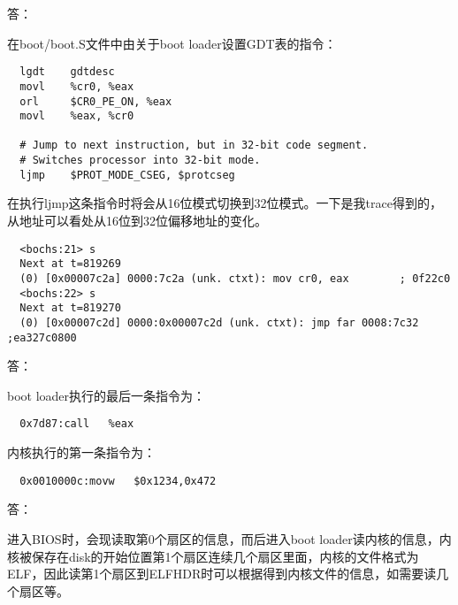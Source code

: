 \documentclass{article}
\begin{document}
\begin{Large}答：\end{Large}
在boot/boot.S文件中由关于boot loader设置GDT表的指令：
\begin{verbatim}
  lgdt    gdtdesc
  movl    %cr0, %eax
  orl     $CR0_PE_ON, %eax
  movl    %eax, %cr0

  # Jump to next instruction, but in 32-bit code segment.
  # Switches processor into 32-bit mode.
  ljmp    $PROT_MODE_CSEG, $protcseg
\end{verbatim}
在执行ljmp这条指令时将会从16位模式切换到32位模式。一下是我trace得到的，从地址可以看处从16位到32位偏移地址的变化。
\begin{verbatim}
  <bochs:21> s
  Next at t=819269
  (0) [0x00007c2a] 0000:7c2a (unk. ctxt): mov cr0, eax        ; 0f22c0
  <bochs:22> s
  Next at t=819270
  (0) [0x00007c2d] 0000:0x00007c2d (unk. ctxt): jmp far 0008:7c32 ;ea327c0800
\end{verbatim}

\begin{Large}答：\end{Large}
boot loader执行的最后一条指令为：
\begin{verbatim}
  0x7d87:call   %eax
\end{verbatim}
内核执行的第一条指令为：
\begin{verbatim}
  0x0010000c:movw	$0x1234,0x472
\end{verbatim}

\begin{Large}答：\end{Large}
进入BIOS时，会现读取第0个扇区的信息，而后进入boot loader读内核的信息，内核被保存在disk的开始位置第1个扇区连续几个扇区里面，内核的文件格式为ELF，因此读第1个扇区到ELFHDR时可以根据得到内核文件的信息，如需要读几个扇区等。
\end{document}
